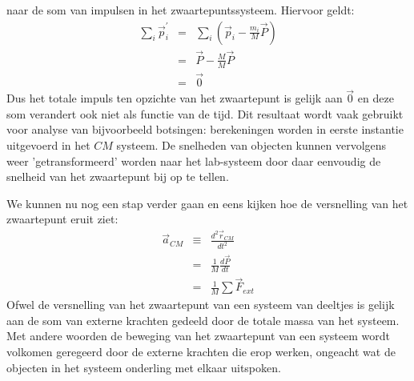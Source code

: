 naar de som van impulsen in het zwaartepuntssysteem. Hiervoor geldt:
\begin{eqnarray}
\sum_i \vec{p}_i^{'} & = & \sum_i \left(\vec{p}_i - \frac{m_i}{M}\vec{P}\right) \\
& = & \vec{P} - \frac{M}{M}\vec{P} \\
& = & \vec{0}
\end{eqnarray}
Dus het totale impuls ten opzichte van het zwaartepunt is gelijk aan $\vec{0}$ en deze som verandert 
ook niet als functie van de tijd. Dit resultaat wordt vaak gebruikt voor analyse van bijvoorbeeld botsingen:
berekeningen worden in eerste instantie uitgevoerd in het $CM$ systeem. De snelheden van objecten 
kunnen vervolgens weer 'getransformeerd' worden naar het lab-systeem door daar eenvoudig de snelheid
van het zwaartepunt bij op te tellen.

We kunnen nu nog een stap verder gaan en eens kijken hoe de versnelling van het zwaartepunt
eruit ziet:
\begin{eqnarray}
\vec{a}_{CM} & \equiv & \frac{d^2\vec{r}_{CM}}{dt^2} \\
& = & \frac{1}{M}\frac{d\vec{P}}{dt} \\
& = & \frac{1}{M}\sum \vec{F}_{ext}
\end{eqnarray}
Ofwel de versnelling van het zwaartepunt van een systeem van deeltjes is gelijk aan de
som van externe krachten gedeeld door de totale massa van het systeem. Met andere woorden
de beweging van het zwaartepunt van een systeem wordt volkomen geregeerd door de externe
krachten die erop werken, ongeacht wat de objecten in het systeem onderling met elkaar 
uitspoken.

